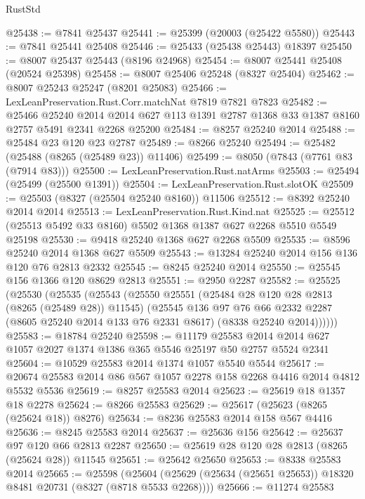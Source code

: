 \begin{lexlean}{RustStd}
\begin{coremodule}
@25438 := @7841 @25437
@25441 := @25399 (@20003 (@25422 @5580))
@25443 := @7841 @25441 @25408
@25446 := @25433 (@25438 @25443) @18397
@25450 := @8007 @25437 @25443 (@8196 @24968)
@25454 := @8007 @25441 @25408 (@20524 @25398)
@25458 := @8007 @25406 @25248 (@8327 @25404)
@25462 := @8007 @25243 @25247 (@8201 @25083)
@25466 := LexLeanPreservation.Rust.Corr.matchNat @7819 @7821 @7823
@25482 := @25466
    @25240
    @2014
    @2014
    @627
    @113
    @1391
    @2787
    @1368
    @33
    @1387
    @8160
    @2757
    @5491
    @2341
    @2268
    @25200
@25484 := @8257 @25240 @2014
@25488 := @25484 @23 @120 @23 @2787
@25489 := @8266 @25240
@25494 := @25482 (@25488 (@8265 (@25489 @23)) @11406)
@25499 := @8050 (@7843 (@7761 @83 (@7914 @83)))
@25500 := LexLeanPreservation.Rust.natArms
@25503 := @25494 (@25499 (@25500 @1391))
@25504 := LexLeanPreservation.Rust.slotOK
@25509 := @25503 (@8327 (@25504 @25240 @8160)) @11506
@25512 := @8392 @25240 @2014 @2014
@25513 := LexLeanPreservation.Rust.Kind.nat
@25525 := @25512 (@25513 @5492 @33 @8160) @5502 @1368 @1387 @627 @2268 @5510 @5549 @25198
@25530 := @9418 @25240 @1368 @627 @2268 @5509
@25535 := @8596 @25240 @2014 @1368 @627 @5509
@25543 := @13284 @25240 @2014 @156 @136 @120 @76 @2813 @2332
@25545 := @8245 @25240 @2014
@25550 := @25545 @156 @1366 @120 @8629 @2813
@25551 := @2950 @2287
@25582 := @25525
    (@25530
      (@25535
        (@25543
          (@25550
            @25551
            (@25484 @28 @120 @28 @2813 (@8265 (@25489 @28)) @11545)
            (@25545
              @136
              @97
              @76
              @66
              @2332
              @2287
              (@8605 @25240 @2014 @133 @76 @2331 @8617)
              (@8338 @25240 @2014))))))
@25583 := @18784 @25240
@25598 := @11179
    @25583
    @2014
    @2014
    @627
    @1057
    @2027
    @1374
    @1386
    @365
    @5546
    @25197
    @50
    @2757
    @5524
    @2341
@25604 := @10529 @25583 @2014 @1374 @1057 @5540 @5544
@25617 := @20674 @25583 @2014 @86 @567 @1057 @2278 @158 @2268 @4416 @2014 @4812 @5532 @5536
@25619 := @8257 @25583 @2014
@25623 := @25619 @18 @1357 @18 @2278
@25624 := @8266 @25583
@25629 := @25617 (@25623 (@8265 (@25624 @18)) @8276)
@25634 := @8236 @25583 @2014 @158 @567 @4416
@25636 := @8245 @25583 @2014
@25637 := @25636 @156
@25642 := @25637 @97 @120 @66 @2813 @2287
@25650 := @25619 @28 @120 @28 @2813 (@8265 (@25624 @28)) @11545
@25651 := @25642 @25650
@25653 := @8338 @25583 @2014
@25665 := @25598
    (@25604 (@25629 (@25634 (@25651 @25653)) @18320 @8481 @20731 (@8327 (@8718 @5533 @2268))))
@25666 := @11274 @25583

\end{coremodule}
\end{lexlean}

